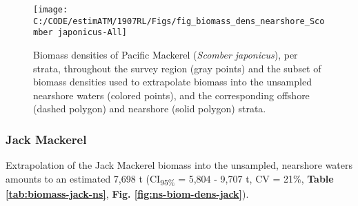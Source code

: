 \documentclass[]{article}
\begin{document}
\newpage



\begin{figure}[H]

{\centering \texttt{[image: C:/CODE/estimATM/1907RL/Figs/fig\_biomass\_dens\_nearshore\_Scomber japonicus-All]} 

}

\caption{Biomass densities of Pacific Mackerel (\emph{Scomber japonicus}), per strata, throughout the survey region (gray points) and the subset of biomass densities used to extrapolate biomass into the unsampled nearshore waters (colored points), and the corresponding offshore (dashed polygon) and nearshore (solid polygon) strata.}\label{fig:ns-biom-dens-mack}
\end{figure}

\newpage

\hypertarget{appendix-nearshore-biomass-jack}{%
\subsubsection{Jack Mackerel}\label{appendix-nearshore-biomass-jack}}

Extrapolation of the Jack Mackerel biomass into the unsampled, nearshore waters amounts to an estimated 7,698 t (CI\textsubscript{95\%} = 5,804 - 9,707 t, CV = 21\%, \textbf{Table \ref{tab:biomass-jack-ns}}, \textbf{Fig. \ref{fig:ns-biom-dens-jack}}).



\begin{table}[!h]

\caption{\label{tab:biomass-jack-ns}Biomass estimates (metric tons, t) and their precision (upper and lower 95\% confidence intervals, CI\textsubscript{95\%}; standard deviation, SD; and coefficient of variation, CV) for Jack Mackerel (\emph{Trachurus symmetricus}) in the unsampled, nearshore waters. Stratum areas are nmi\textsuperscript{2}.}
\centering
{}
\end{table}
\end{document}
